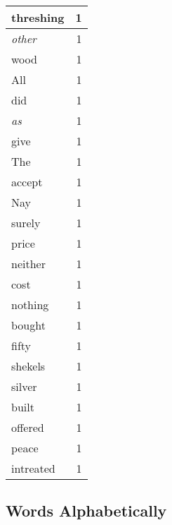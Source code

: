 \begin{center}
\begin{longtable}{l|r}
threshing & 1 \\ \hline
\emph{other} & 1 \\ \hline
wood & 1 \\ \hline
All & 1 \\ \hline
did & 1 \\ \hline
\emph{as} & 1 \\ \hline
give & 1 \\ \hline
The & 1 \\ \hline
accept & 1 \\ \hline
Nay & 1 \\ \hline
surely & 1 \\ \hline
price & 1 \\ \hline
neither & 1 \\ \hline
cost & 1 \\ \hline
nothing & 1 \\ \hline
bought & 1 \\ \hline
fifty & 1 \\ \hline
shekels & 1 \\ \hline
silver & 1 \\ \hline
built & 1 \\ \hline
offered & 1 \\ \hline
peace & 1 \\ \hline
intreated & 1 \\ \hline
\end{longtable}
\end{center}



\normalsize



\subsection{Words Alphabetically}

